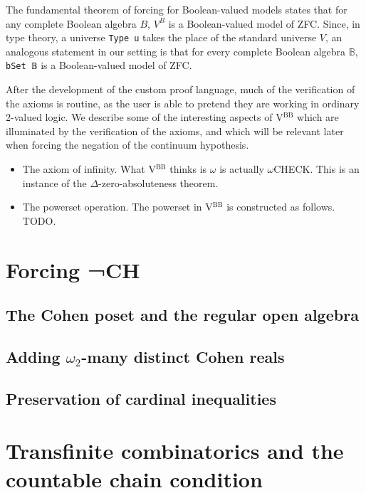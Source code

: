 \documentclass[a4paper,USenglish,cleveref, autoref]{lipics-v2019}
\newcommand{\B}{\mathbb{B}}
\begin{document}
The fundamental theorem of forcing for Boolean-valued models \cite{hamkins-seabold1} states that for any complete Boolean algebra $B$, $V^B$ is a Boolean-valued model of ZFC. Since, in type theory, a universe \lstinline{Type u} takes the place of the standard universe $V$, an analogous statement in our setting is that for every complete Boolean algebra $\B$, \lstinline{bSet 𝔹} is a Boolean-valued model of ZFC.

After the development of the custom proof language, much of the verification of the axioms is routine, as the user is able to pretend they are working in ordinary 2-valued logic. We describe some of the interesting aspects of V\(^{\text{BB}}\) which are illuminated by the verification of the axioms, and which will be relevant later when forcing the negation of the continuum hypothesis.

\begin{itemize}
\item The axiom of infinity. What V\(^{\text{BB}}\) thinks is $\omega$ is actually $\omega$CHECK. This is an instance of the $\Delta$-zero-absoluteness theorem.

\item The powerset operation. The powerset in V\(^{\text{BB}}\) is constructed as follows. TODO.
\end{itemize}
\section{Forcing ¬CH}
\label{sect:forcing}
\subsection{The Cohen poset and the regular open algebra}

\subsection{Adding $\omega_2$-many distinct Cohen reals}

\subsection{Preservation of cardinal inequalities}

\section{Transfinite combinatorics and the countable chain condition}
\label{sect:ccc}
\end{document}

